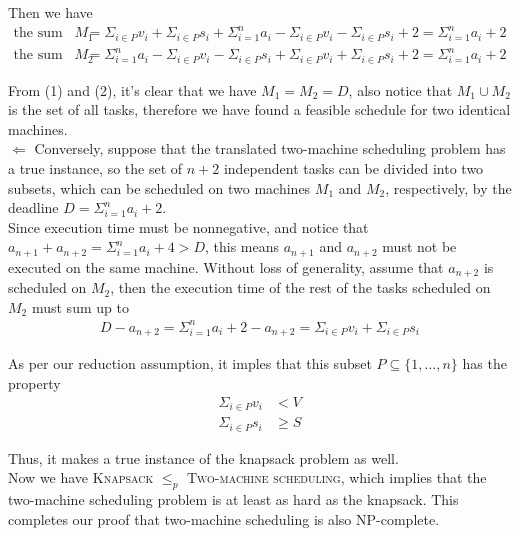 \documentclass[11pt]{article}
\begin{document}
    Then we have
    \begin{align}
      \text{the sum of } M_1 &= \Sigma_{i \in P} v_i + \Sigma_{i \in P} s_i + \Sigma_{i=1}^{n} a_i - \Sigma_{i \in P} v_i - \Sigma_{i \in P} s_i + 2 = \Sigma_{i=1}^{n} a_i + 2\\
      \text{the sum of } M_2 &= \Sigma_{i=1}^{n} a_i - \Sigma_{i \in P} v_i - \Sigma_{i \in P} s_i + \Sigma_{i \in P} v_i + \Sigma_{i \in P} s_i + 2 = \Sigma_{i=1}^{n} a_i + 2
    \end{align}

    From (1) and (2), it's clear that we have $M_1=M_2=D$, also notice that $M_1 \cup M_2 $ is the set of all tasks, therefore we have found a feasible schedule for two identical machines.\\

    $\Leftarrow$ Conversely, suppose that the translated two-machine scheduling problem has a true instance, so the set of $n + 2$ independent tasks can be divided into two subsets, which can be scheduled on two machines $M_1$ and $M_2$, respectively, by the deadline $D = \Sigma_{i=1}^{n} a_i + 2$.\\

    Since execution time must be nonnegative, and notice that $a_{n+1} + a_{n+2} = \Sigma_{i=1}^{n} a_i + 4>D$, this means $a_{n+1}$ and $a_{n+2}$ must not be executed on the same machine. Without loss of generality, assume that $a_{n+2}$ is scheduled on $M_2$, then the execution time of the rest of the tasks scheduled on $M_2$ must sum up to
    \begin{align*}
      D - a_{n+2} = \Sigma_{i=1}^{n} a_i + 2 - a_{n+2} = \Sigma_{i \in P} v_i + \Sigma_{i \in P} s_i
    \end{align*}

    As per our reduction assumption, it imples that this subset $P \subseteq \{1, \dots, n\}$ has the property
    \begin{align*}
      \Sigma_{i \in P} v_i &< V\\
      \Sigma_{i \in P} s_i &\geq S
    \end{align*}

    Thus, it makes a true instance of the knapsack problem as well.\\

    Now we have \textsc{Knapsack} $\leq_p$ \textsc{Two-machine scheduling}, which implies that the two-machine scheduling problem is at least as hard as the knapsack. This completes our proof that two-machine scheduling is also NP-complete.\\
\end{document}
